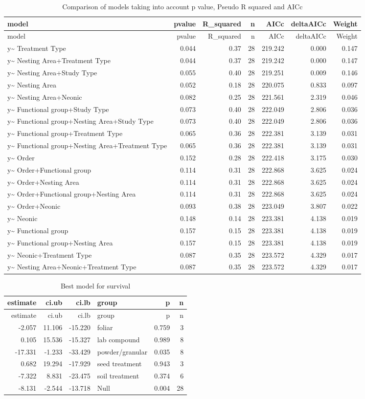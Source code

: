 \documentclass[]{elsarticle} %
\begin{document}
\begin{longtable}[c]{@{}lrrrrrr@{}}
\caption{Comparison of models taking into account p value, Pseudo R
squared and AICc}\tabularnewline
\toprule
model & pvalue & R\_squared & n & AICc & deltaAICc &
Weight\tabularnewline
\midrule
\endfirsthead
\toprule
model & pvalue & R\_squared & n & AICc & deltaAICc &
Weight\tabularnewline
\midrule
\endhead
y\textasciitilde{} Treatment Type & 0.044 & 0.37 & 28 & 219.242 & 0.000
& 0.147\tabularnewline
y\textasciitilde{} Nesting Area+Treatment Type & 0.044 & 0.37 & 28 &
219.242 & 0.000 & 0.147\tabularnewline
y\textasciitilde{} Nesting Area+Study Type & 0.055 & 0.40 & 28 & 219.251
& 0.009 & 0.146\tabularnewline
y\textasciitilde{} Nesting Area & 0.052 & 0.18 & 28 & 220.075 & 0.833 &
0.097\tabularnewline
y\textasciitilde{} Nesting Area+Neonic & 0.082 & 0.25 & 28 & 221.561 &
2.319 & 0.046\tabularnewline
y\textasciitilde{} Functional group+Study Type & 0.073 & 0.40 & 28 &
222.049 & 2.806 & 0.036\tabularnewline
y\textasciitilde{} Functional group+Nesting Area+Study Type & 0.073 &
0.40 & 28 & 222.049 & 2.806 & 0.036\tabularnewline
y\textasciitilde{} Functional group+Treatment Type & 0.065 & 0.36 & 28 &
222.381 & 3.139 & 0.031\tabularnewline
y\textasciitilde{} Functional group+Nesting Area+Treatment Type & 0.065
& 0.36 & 28 & 222.381 & 3.139 & 0.031\tabularnewline
y\textasciitilde{} Order & 0.152 & 0.28 & 28 & 222.418 & 3.175 &
0.030\tabularnewline
y\textasciitilde{} Order+Functional group & 0.114 & 0.31 & 28 & 222.868
& 3.625 & 0.024\tabularnewline
y\textasciitilde{} Order+Nesting Area & 0.114 & 0.31 & 28 & 222.868 &
3.625 & 0.024\tabularnewline
y\textasciitilde{} Order+Functional group+Nesting Area & 0.114 & 0.31 &
28 & 222.868 & 3.625 & 0.024\tabularnewline
y\textasciitilde{} Order+Neonic & 0.093 & 0.38 & 28 & 223.049 & 3.807 &
0.022\tabularnewline
y\textasciitilde{} Neonic & 0.148 & 0.14 & 28 & 223.381 & 4.138 &
0.019\tabularnewline
y\textasciitilde{} Functional group & 0.157 & 0.15 & 28 & 223.381 &
4.138 & 0.019\tabularnewline
y\textasciitilde{} Functional group+Nesting Area & 0.157 & 0.15 & 28 &
223.381 & 4.138 & 0.019\tabularnewline
y\textasciitilde{} Neonic+Treatment Type & 0.087 & 0.35 & 28 & 223.572 &
4.329 & 0.017\tabularnewline
y\textasciitilde{} Nesting Area+Neonic+Treatment Type & 0.087 & 0.35 &
28 & 223.572 & 4.329 & 0.017\tabularnewline
\bottomrule
\end{longtable}

\begin{longtable}[c]{@{}rrrlrr@{}}
\caption{Best model for survival}\tabularnewline
\toprule
estimate & ci.ub & ci.lb & group & p & n\tabularnewline
\midrule
\endfirsthead
\toprule
estimate & ci.ub & ci.lb & group & p & n\tabularnewline
\midrule
\endhead
-2.057 & 11.106 & -15.220 & foliar & 0.759 & 3\tabularnewline
0.105 & 15.536 & -15.327 & lab compound & 0.989 & 8\tabularnewline
-17.331 & -1.233 & -33.429 & powder/granular & 0.035 & 8\tabularnewline
0.682 & 19.294 & -17.929 & seed treatment & 0.943 & 3\tabularnewline
-7.322 & 8.831 & -23.475 & soil treatment & 0.374 & 6\tabularnewline
-8.131 & -2.544 & -13.718 & Null & 0.004 & 28\tabularnewline
\bottomrule
\end{longtable}
\end{document}
